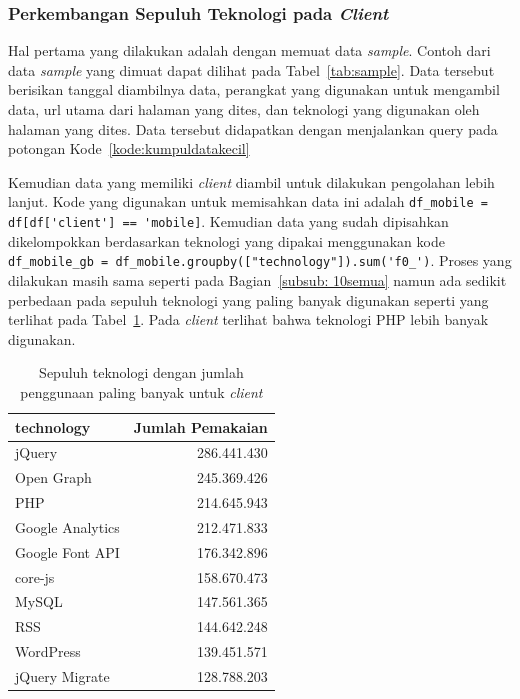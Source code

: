 \subsubsection{Perkembangan Sepuluh Teknologi pada \textit{Client} \mobile}
\label{subsub:10mobile}
Hal pertama yang dilakukan adalah dengan memuat data \textit{sample}. Contoh dari data \textit{sample} yang dimuat dapat dilihat pada Tabel~\ref{tab:sample}. Data tersebut berisikan tanggal diambilnya data, perangkat yang digunakan untuk mengambil data, url utama dari halaman \web yang dites, dan teknologi yang digunakan oleh halaman \web yang dites. Data tersebut didapatkan dengan menjalankan query pada potongan Kode~\ref{kode:kumpuldatakecil} 

Kemudian data yang memiliki \textit{client} \mobile diambil untuk dilakukan pengolahan lebih lanjut. Kode yang digunakan untuk memisahkan data ini adalah \verb|df_mobile = df[df['client'] == 'mobile]|. Kemudian data yang sudah dipisahkan dikelompokkan berdasarkan teknologi yang dipakai menggunakan kode \verb|df_mobile_gb = df_mobile.groupby(["technology"]).sum('f0_')|. Proses yang dilakukan masih sama seperti pada Bagian~\ref{subsub: 10semua} namun ada sedikit perbedaan pada sepuluh teknologi yang paling banyak digunakan seperti yang terlihat pada Tabel~\ref{tab:sepuluhmobile}. Pada \textit{client} \mobile terlihat bahwa teknologi PHP lebih banyak digunakan.
\begin{table}[H]
    \centering
    \caption{Sepuluh teknologi dengan jumlah penggunaan paling banyak untuk \textit{client} \mobile}
    \label{tab:sepuluhmobile}
    \begin{tabular}{|l|r|}
        \hline
        technology & Jumlah Pemakaian \\ \hline
        jQuery & 286.441.430 \\ \hline
        Open Graph & 245.369.426 \\ \hline
        PHP & 214.645.943 \\ \hline
        Google Analytics & 212.471.833 \\ \hline
        Google Font API & 176.342.896 \\ \hline
        core-js & 158.670.473 \\ \hline
        MySQL & 147.561.365 \\ \hline
        RSS & 144.642.248 \\ \hline
        WordPress & 139.451.571 \\ \hline
        jQuery Migrate & 128.788.203 \\ \hline
    \end{tabular}
\end{table}

